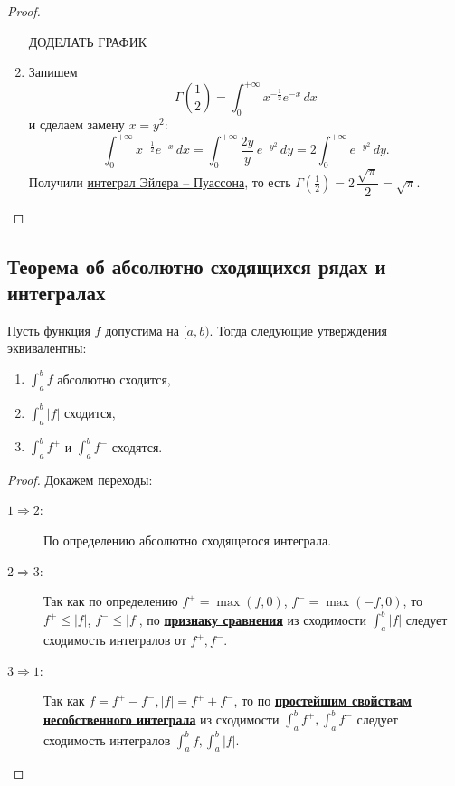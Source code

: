\begin{proof}
\begin{enumerate}
		ДОДЕЛАТЬ ГРАФИК
		\item Запишем \[
		\Gamma \left(\frac{1}{2} \right) = \int_{0}^{+\infty} x^{-\frac{1}{2}} e^{-x} \, dx
		\]
		и сделаем замену \(x = y^2\): \[
		\int_{0}^{+\infty} x^{-\frac{1}{2}} e^{-x} \, dx = \int_{0}^{+\infty} \frac{2y}{y} \, e^{-y^2} \, dy = 2 \int_{0}^{+\infty} e^{-y^2} \, dy.
		\]
		Получили \hyperlink{puas}{интеграл Эйлера -- Пуассона}, то есть \(\Gamma \left(\frac{1}{2} \right) = 2 \, \dfrac{\sqrt{\pi}}{2} = \sqrt{\pi}\).
	\end{enumerate}
\end{proof}

\subsection{Теорема об абсолютно сходящихся рядах и интегралах}

\begin{ntheorem} \hypertarget{t42}{}
	Пусть функция \(f\) допустима на \([a, b)\). Тогда следующие утверждения эквивалентны:
	\begin{enumerate}
		\item \(\int_{a}^{b} f\) абсолютно сходится,
		\item \(\int_{a}^{b} |f|\) сходится,
		\item \(\int_{a}^{b} f^+\) и \(\int_{a}^{b} f^-\) сходятся.
	\end{enumerate} 
\end{ntheorem}
\begin{proof}
	Докажем переходы:
	\begin{description}
		\item[\(1 \Rightarrow 2\):] По определению абсолютно сходящегося интеграла.
		\item[\(2 \Rightarrow 3\):] Так как по определению \(f^+ = \max (f, 0)\), \(f^- = \max (-f, 0)\), то \(f^+ \leqslant |f|\), \(f^- \leqslant |f|\), по \hyperlink{priz}{\bfseries признаку сравнения} из сходимости \(\int_{a}^{b} |f|\) следует сходимость интегралов от \(f^+, f^-\).
		\item[\(3 \Rightarrow 1\):] Так как \(f = f^+ - f^-, |f| = f^+ + f^-\), то по \hyperlink{svva}{\bfseries простейшим свойствам несобственного интеграла} из сходимости \(\int_{a}^{b} f^+, \int_{a}^{b} f^-\) следует сходимость интегралов \(\int_{a}^{b} f, \int_{a}^{b} |f|\).
	\end{description}
\end{proof}

